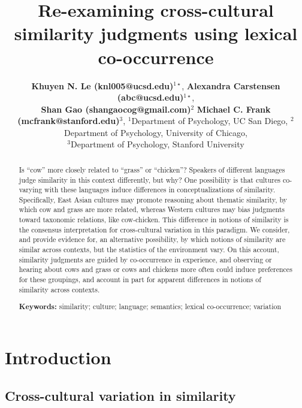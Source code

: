 \documentclass[10pt, letterpaper]{article}
\title{Re-examining cross-cultural similarity judgments using lexical
co-occurrence}
\author{{\large \bf Khuyen N. Le (knl005@ucsd.edu)}$^{1\star}$, {\large \bf Alexandra Carstensen (abc@ucsd.edu)}$^{1\star}$, \\ {\large \bf Shan Gao (shangaocog@gmail.com)$^2$} {\large \bf Michael C. Frank (mcfrank@stanford.edu)$^3$},  \AND $^1$Department of Psychology, UC San Diego, $^2$Department of Psychology, University of Chicago, \\ $^3$Department of Psychology, Stanford University }
\begin{document}
\maketitle

\begin{abstract}
Is ``cow'' more closely related to ``grass'' or ``chicken''? Speakers of
different languages judge similarity in this context differently, but
why? One possibility is that cultures co-varying with these languages
induce differences in conceptualizations of similarity. Specifically,
East Asian cultures may promote reasoning about thematic similarity, by
which cow and grass are more related, whereas Western cultures may bias
judgments toward taxonomic relations, like cow-chicken. This difference
in notions of similarity is the consensus interpretation for
cross-cultural variation in this paradigm. We consider, and provide
evidence for, an alternative possibility, by which notions of similarity
are similar across contexts, but the statistics of the environment vary.
On this account, similarity judgments are guided by co-occurrence in
experience, and observing or hearing about cows and grass or cows and
chickens more often could induce preferences for these groupings, and
account in part for apparent differences in notions of similarity across
contexts.

\textbf{Keywords:}
similarity; culture; language; semantics; lexical co-occurrence;
variation
\end{abstract}

\hypertarget{introduction}{%
\section{Introduction}\label{introduction}}

\hypertarget{cross-cultural-variation-in-similarity}{%
\subsection{Cross-cultural variation in
similarity}\label{cross-cultural-variation-in-similarity}}
\end{document}
